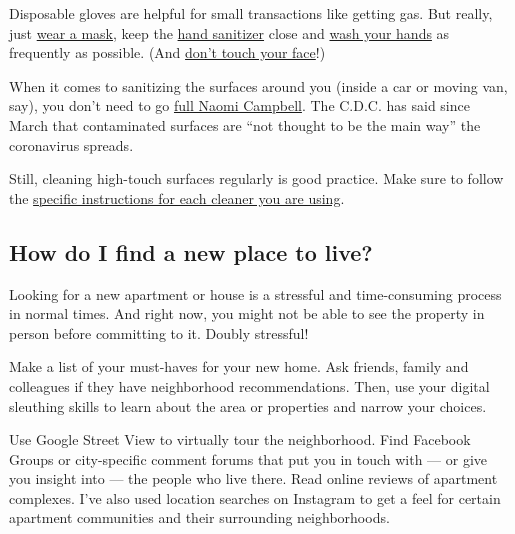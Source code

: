 Disposable gloves are helpful for small transactions like getting gas.
But really, just
\href{https://www.nytimes3xbfgragh.onion/article/coronavirus-facts-history.html\#link-6ec3dc3a}{wear
a mask}, keep the
\href{https://www.cdc.gov/coronavirus/2019-ncov/prevent-getting-sick/prevention.html?CDC_AA_refVal=https\%3A\%2F\%2Fwww.cdc.gov\%2Fcoronavirus\%2F2019-ncov\%2Fprepare\%2Fprevention.html}{hand
sanitizer} close and
\href{https://www.nytimes3xbfgragh.onion/2020/03/13/world/how-to-wash-your-hands-coronavirus.html}{wash
your hands} as frequently as possible. (And
\href{https://www.nytimes3xbfgragh.onion/2020/03/05/health/stop-touching-your-face-coronavirus.html}{don't
touch your face}!)

When it comes to sanitizing the surfaces around you (inside a car or
moving van, say), you don't need to go
\href{https://www.nytimes3xbfgragh.onion/2020/06/22/style/11-things-about-naomi-campbell.html}{full
Naomi Campbell}. The C.D.C. has said since March that contaminated
surfaces are ``not thought to be the main way'' the coronavirus spreads.

Still, cleaning high-touch surfaces regularly is good practice. Make
sure to follow the
\href{https://www.nytimes3xbfgragh.onion/2020/05/06/well/live/coronavirus-cleaning-cleaners-disinfectants-home.html}{specific
instructions for each cleaner you are using}.

\hypertarget{how-do-i-find-a-new-place-to-live}{%
\subsection{How do I find a new place to
live?}\label{how-do-i-find-a-new-place-to-live}}

Looking for a new apartment or house is a stressful and time-consuming
process in normal times. And right now, you might not be able to see the
property in person before committing to it. Doubly stressful!

Make a list of your must-haves for your new home. Ask friends, family
and colleagues if they have neighborhood recommendations. Then, use your
digital sleuthing skills to learn about the area or properties and
narrow your choices.

Use Google Street View to virtually tour the neighborhood. Find Facebook
Groups or city-specific comment forums that put you in touch with --- or
give you insight into --- the people who live there. Read online reviews
of apartment complexes. I've also used location searches on Instagram to
get a feel for certain apartment communities and their surrounding
neighborhoods.

